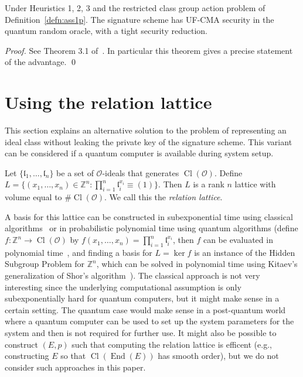 \documentclass{llncs}
\newcommand{\OO}{\mathcal{O}}
\newcommand{\Z}{\mathbb{Z}}
\DeclareMathOperator{\End}{End}
\DeclareMathOperator{\Cl}{Cl}
\renewcommand{\l}{\mathfrak{l}}
\begin{document}
\begin{theorem}
Under Heuristics 1, 2, 3 and the restricted class group action problem of Definition~\ref{defn:ass1p}.
The signature scheme has UF-CMA security in the quantum random oracle, with a tight security reduction.
\end{theorem}
 

\begin{proof}
See Theorem 3.1 of~\cite{KLS18}.
In particular this theorem gives a precise statement of the advantage. \qed
\end{proof}





\section{Using the relation lattice}\label{sec:sig-relation-lattice}

This section explains an alternative solution to the problem of representing an ideal class without leaking the private key of the signature scheme.
This variant can be considered if a quantum computer is available during system setup.


Let $\{ \l_1, \dots, \l_n \}$ be a set of $\OO$-ideals that generates $\Cl( \OO )$.
Define $L = \{ (x_1, \dots, x_n ) \in \Z^n : \prod_{i=1}^n \l_i^{x_i} \equiv (1) \}$.
Then $L$ is a rank $n$ lattice with volume equal to $\#\Cl(\OO)$.
We call this the \emph{relation lattice}.

A basis for this lattice can be constructed in subexponential time using classical algorithms~\cite{hafner1989rigorous,biasse_fieker_jacobson_2016} or in probabilistic polynomial time using quantum algorithms (define $f:\Z^n\to\Cl(\OO)$ by $f(x_1,\dots,x_n)=\prod_{i=1}^n\l_i^{x_i}$, then $f$ can be evaluated in polynomial time~\cite{shanks1989gauss,Cohen1993}, and finding a basis for $L=\ker f$ is an instance of the Hidden Subgroup Problem for $\Z^n$, which can be solved in polynomial time using Kitaev's generalization of Shor's algorithm~\cite{kitaev1995hsp}).
The classical approach is not very interesting since the underlying computational assumption is only subexponentially hard for quantum computers, but it might make sense in a certain setting.
The quantum case would make sense in a post-quantum world where a quantum computer can be used to set up the system parameters for the system and then is not required for further use.
It might also be possible to construct $(E, p )$ such that computing the relation lattice is efficent (e.g., constructing $E$ so that $\Cl( \End(E))$ has smooth order), but we do not consider such approaches in this paper.
\end{document}
